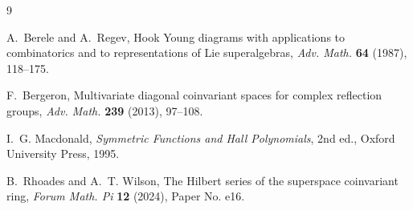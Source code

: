 \documentclass[11pt]{article}
\begin{document}
\begin{thebibliography}{9}

A.~Berele and A.~Regev,
\newblock Hook Young diagrams with applications to combinatorics and to representations of Lie superalgebras,
\newblock \emph{Adv. Math.} \textbf{64} (1987), 118--175.

F.~Bergeron,
\newblock Multivariate diagonal coinvariant spaces for complex reflection groups,
\newblock \emph{Adv. Math.} \textbf{239} (2013), 97--108.

I.~G. Macdonald,
\newblock \emph{Symmetric Functions and Hall Polynomials},
\newblock 2nd ed., Oxford University Press, 1995.

B.~Rhoades and A.~T. Wilson,
\newblock The Hilbert series of the superspace coinvariant ring,
\newblock \emph{Forum Math. Pi} \textbf{12} (2024), Paper No. e16.

\end{thebibliography}
\end{document}
